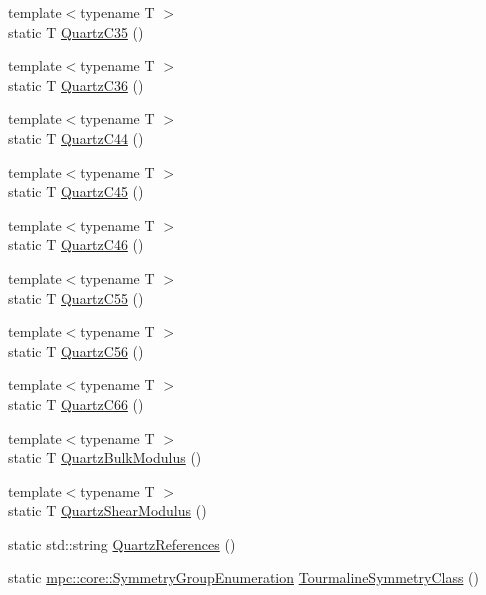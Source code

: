 \begin{DoxyCompactItemize}
\item 
{\footnotesize template$<$typename T $>$ }\\static T \mbox{\hyperlink{namespacempc_1_1data_a3b7ce8993e7675fad907410daa83e653}{Quartz\+C35}} ()
\item 
{\footnotesize template$<$typename T $>$ }\\static T \mbox{\hyperlink{namespacempc_1_1data_a7e7c64e2af31e8cab324518000ebc032}{Quartz\+C36}} ()
\item 
{\footnotesize template$<$typename T $>$ }\\static T \mbox{\hyperlink{namespacempc_1_1data_ad5a967f86f566d876049b0b0b4057f96}{Quartz\+C44}} ()
\item 
{\footnotesize template$<$typename T $>$ }\\static T \mbox{\hyperlink{namespacempc_1_1data_a4c87e86635514d7267a28a1dd9d5fcd2}{Quartz\+C45}} ()
\item 
{\footnotesize template$<$typename T $>$ }\\static T \mbox{\hyperlink{namespacempc_1_1data_a57bcf46b8e0fd3057742dd40a70f3298}{Quartz\+C46}} ()
\item 
{\footnotesize template$<$typename T $>$ }\\static T \mbox{\hyperlink{namespacempc_1_1data_adb886dc69088232e2380eca2d796ed48}{Quartz\+C55}} ()
\item 
{\footnotesize template$<$typename T $>$ }\\static T \mbox{\hyperlink{namespacempc_1_1data_a653a8e49b5eced21eca429e1109c2d91}{Quartz\+C56}} ()
\item 
{\footnotesize template$<$typename T $>$ }\\static T \mbox{\hyperlink{namespacempc_1_1data_a45e2a5fcad934800dcc84de5a32fe736}{Quartz\+C66}} ()
\item 
{\footnotesize template$<$typename T $>$ }\\static T \mbox{\hyperlink{namespacempc_1_1data_adda154a5fa01966c295515c9adb35fdd}{Quartz\+Bulk\+Modulus}} ()
\item 
{\footnotesize template$<$typename T $>$ }\\static T \mbox{\hyperlink{namespacempc_1_1data_af3524f0e5dccaef40b384a3668ba5f90}{Quartz\+Shear\+Modulus}} ()
\item 
static std\+::string \mbox{\hyperlink{namespacempc_1_1data_a8d145e0915845b9e70302411fff6ce84}{Quartz\+References}} ()
\item 
static \mbox{\hyperlink{namespacempc_1_1core_a9d979684062547055a0ef5c13077bad8}{mpc\+::core\+::\+Symmetry\+Group\+Enumeration}} \mbox{\hyperlink{namespacempc_1_1data_a1e0ce1adbf37fb11e488b6c5c50ac5e8}{Tourmaline\+Symmetry\+Class}} ()

\end{DoxyCompactItemize}

